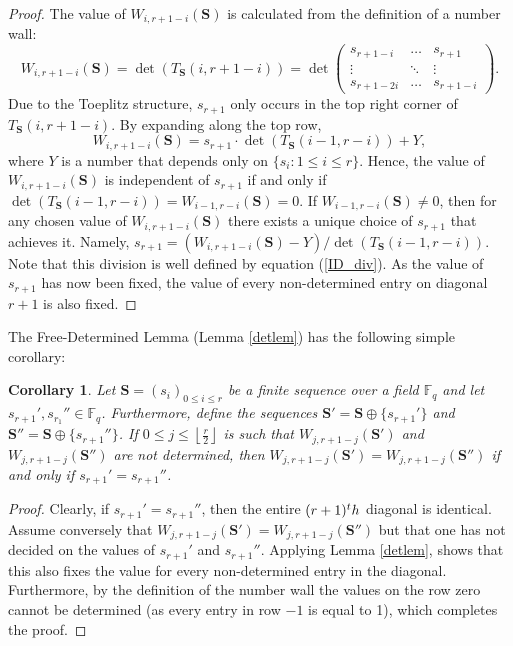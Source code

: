 \documentclass{article}
\newtheorem{cor}[theorem]{Corollary}
\theoremstyle{definition}
\newcommand{\nth}{\textup{th}}
\newcommand{\F}{\mathbb{F}}
\numberwithin{equation}{subsection}
\begin{document}
\begin{proof}
\noindent The value of $W_{i,r+1-i}(\mathbf{S})$ is calculated from the definition of a number wall: \begin{equation}
W_{i,r+1-i}(\mathbf{S})=\det(T_{\mathbf{S}}(i,r+1-i))=\det\begin{pmatrix}s_{r+1-i}&\dots&s_{r+1}\\
\vdots&\ddots&\vdots\\
s_{r+1-2i}&\dots&s_{r+1-i}\end{pmatrix}.\nonumber
\end{equation}
\noindent Due to the Toeplitz structure, $s_{r+1}$ only occurs in the top right corner of $T_{\mathbf{S}}(i,r+1-i)$. By expanding along the top row, \begin{equation}\label{ID_div}
W_{i,r+1-i}(\mathbf{S})=s_{r+1}\cdot \det(T_{\mathbf{S}}(i-1,r-i))+Y,
\end{equation}
\noindent where $Y$ is a number that depends only on $\{s_i:1\le i \le r\}$. Hence, the value of $W_{i,r+1-i}(\mathbf{S})$ is independent of $s_{r+1}$ if and only if $\det(T_{\mathbf{S}}(i-1,r-i))=W_{i-1,r-i}(\mathbf{S})=0$. If $W_{i-1,r-i}(\mathbf{S})\neq0$, then for any chosen value of $W_{i,r+1-i}(\mathbf{S})$ there exists a unique choice of $s_{r+1}$ that achieves it. Namely, $s_{r+1}=(W_{i,r+1-i}(\mathbf{S})-Y)/\det(T_{\mathbf{S}}(i-1,r-i))$. Note that this division is well defined by equation (\ref{ID_div}). As the value of $s_{r+1}$ has now been fixed, the value of every non-determined entry on diagonal $r+1$ is also fixed.
\end{proof}
\noindent The Free-Determined Lemma (Lemma \ref{detlem}) has the following simple corollary:

\begin{cor} \label{diag}
Let $\mathbf{S}=(s_i)_{0\le i \le r}$ be a finite sequence over a field $\F_q$ and let $s_{r+1}', s_{r_1}''\in\F_q$. Furthermore, define the sequences $ \mathbf{S}'= \mathbf{S}\oplus\{s_{r+1}'\}$ and $ \mathbf{S}''= \mathbf{S}\oplus\{s_{r+1}''\}$. If $0\le j\le\left\lfloor\frac{r}{2}\right\rfloor$ is such that $W_{j,r+1-j}( \mathbf{S}')$ and $W_{j,r+1-j}( \mathbf{S}'')$ are not determined, then $W_{j,r+1-j}( \mathbf{S}')=W_{j,r+1-j}( \mathbf{S}'')$ if and only if $s_{r+1}'=s_{r+1}''$. 
\end{cor}

\begin{proof}
\noindent Clearly, if $s_{r+1}'=s_{r+1}''$, then the entire $(r+1)^\nth$ diagonal is identical. Assume conversely that $W_{j,r+1-j}( \mathbf{S}')= W_{j,r+1-j}( \mathbf{S}'')$ but that one has not decided on the values of $s_{r+1}'$ and $s_{r+1}''$. Applying Lemma \ref{detlem}, shows that this also fixes the value for every non-determined entry in the diagonal. Furthermore, by the definition of the number wall the values on the row zero cannot be determined (as every entry in row $-1$ is equal to 1), which completes the proof. 
\end{proof}
\end{document}
